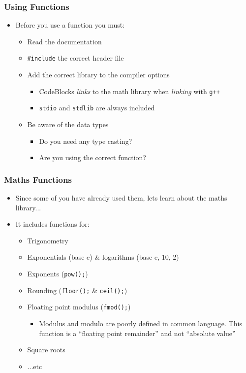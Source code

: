 \documentclass[14pt]{beamer}
\begin{document}
\begin{frame}
\frametitle{Using Functions}
\begin{itemize}
\item Before you use a function you must:
	\begin{itemize}
		\item Read the documentation
		\item \texttt{\#include} the correct header file
		\item Add the correct library to the compiler options
			\begin{itemize}
				\item CodeBlocks \textit{links} to the math library when \textit{linking} with \texttt{g++}
				\item \texttt{stdio} and \texttt{stdlib} are always included
			\end{itemize}
		\item Be aware of the data types
			\begin{itemize}
				\item Do you need any type casting?
				\item Are you using the correct function?
			\end{itemize}
	\end{itemize}
\end{itemize}
\end{frame}

\begin{frame}
\frametitle{Maths Functions}
\begin{itemize}
\item Since some of you have already used them, lets learn about the maths library...
\item It includes functions for:
	\begin{itemize}
		\item Trigonometry
		\item Exponentials (base e) \& logarithms (base e, 10, 2)
		\item Exponents (\texttt{pow();})
		\item Rounding (\texttt{floor();} \& \texttt{ceil();})
		\item Floating point modulus (\texttt{fmod();})
			\begin{itemize}
				\item Modulus and modulo are poorly defined in common language. This function is a ``floating point remainder'' and not ``absolute value''
			\end{itemize}
		\item Square roots
		\item ...etc
	\end{itemize}
\end{itemize}
\end{frame}
\end{document}
